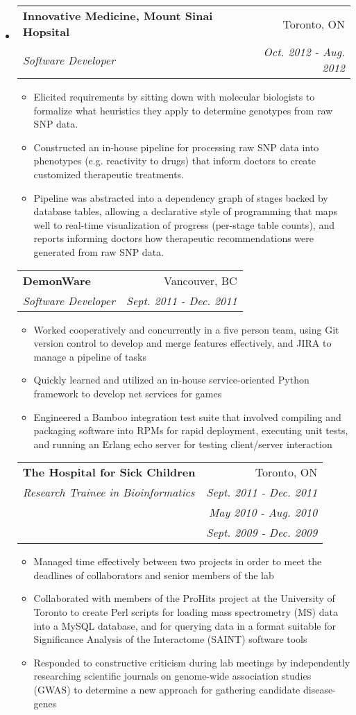 \documentclass[letterpaper,11pt]{article}
\makeatletter
\newcommand{\resitem}[1]{\item #1 \vspace{-2pt}}
\newcommand{\resheading}[1]{{\large \parashade[.95]{roundcorners}{\textbf{#1 \vphantom{p\^{E}}}}}}
\newcommand{\ressubheading}[4]{
\begin{tabular*}{6.5in}{l@{\extracolsep{\fill}}r}
		\textbf{#1} & #2 \\
		\textit{#3} & \textit{#4} \\
\end{tabular*}\vspace{-6pt}}
\newcommand{\sickkids}[6]{
\begin{tabular*}{6.5in}{l@{\extracolsep{\fill}}r}
		\textbf{#1} & #2 \\
		\textit{#3} & \textit{#4} \\
		 & \textit{#5} \\
		 & \textit{#6} \\
\end{tabular*}\vspace{-6pt}}
\makeatother
\begin{document}
\resheading{Work Experience}
\begin{itemize}
\item

	\ressubheading{Innovative Medicine, Mount Sinai Hopsital}{Toronto, ON}{Software Developer}{Oct. 2012 - Aug. 2012}
	\begin{itemize}
		\resitem{
            Elicited requirements by sitting down with molecular biologists to formalize 
            what heuristics they apply to determine genotypes from raw SNP data.
        }
		\resitem{
            Constructed an in-house pipeline for processing raw SNP data into phenotypes 
            (e.g. reactivity to drugs) that inform doctors to create customized therapeutic 
            treatments.  
        }
        \resitem{
            Pipeline was abstracted into a dependency graph of stages backed by database 
            tables, allowing a declarative style of programming that maps well to real-time 
            visualization of progress (per-stage table counts), and reports informing 
            doctors how therapeutic recommendations were generated from raw SNP data.
        }
	\end{itemize}

	\ressubheading{DemonWare}{Vancouver, BC}{Software Developer}{Sept. 2011 - Dec. 2011}
	\begin{itemize}
		\resitem{
            Worked cooperatively and concurrently in a five person team, using Git version 
            control to develop and merge features effectively, and JIRA to manage a pipeline of 
            tasks
        }
        \resitem{
            Quickly learned and utilized an in-house service-oriented Python framework to 
            develop net services for games
        }
        \resitem{
            Engineered a Bamboo integration test suite that involved compiling and packaging 
            software into RPMs for rapid deployment, executing unit tests, and running an 
            Erlang echo server for testing client/server interaction 
        }
	\end{itemize}

	\sickkids{The Hospital for Sick Children}{Toronto, ON}{Research Trainee in 
    Bioinformatics}{Sept. 2011 - Dec. 2011}{May 2010 - Aug. 2010}{Sept. 2009 - Dec. 2009}
	\begin{itemize}
        \resitem{
            Managed time effectively between two projects in order to meet the deadlines of 
            collaborators and senior members of the lab
        }
        \resitem{
             Collaborated with members of the ProHits project at the University of Toronto 
             to create Perl scripts for loading mass spectrometry (MS) data into a MySQL 
             database, and for querying data in a format suitable for Significance Analysis 
             of the Interactome (SAINT) software tools
        }
        \resitem{
            Responded to constructive criticism during lab meetings by independently 
            researching scientific journals on genome-wide association studies (GWAS) to 
            determine a new approach for gathering candidate disease-genes
        }


\end{itemize}
\end{itemize}
\end{document}
